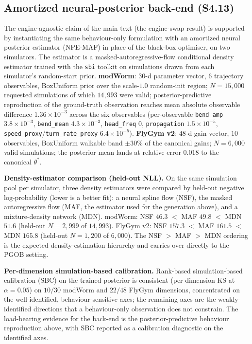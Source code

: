 \documentclass[11pt]{article}
\begin{document}
\subsection{Amortized neural-posterior back-end (S4.13)}
\label{si:sbi}
The engine-agnostic claim of the main text (the engine-swap result) is supported by instantiating the same behaviour-only formulation with an amortized neural posterior estimator (NPE-MAF) in place of the black-box optimiser, on two simulators. The estimator is a masked-autoregressive-flow conditional density estimator trained with the \texttt{sbi} toolkit on simulations drawn from each simulator's random-start prior. \textbf{modWorm}: $30$-d parameter vector, $6$ trajectory observables, BoxUniform prior over the scale-$1.0$ random-init region; $N{=}15{,}000$ requested simulations of which $14{,}993$ were valid; posterior-predictive reproduction of the ground-truth observation reaches mean absolute observable difference $1.36\times10^{-3}$ across the six observables (per-observable \texttt{bend\_amp} $3.8\times10^{-3}$, \texttt{bend\_mean} $4.3\times10^{-3}$, \texttt{head\_freq} $0$, \texttt{propagation} $1.5\times10^{-5}$, \texttt{speed\_proxy}/\texttt{turn\_rate\_proxy} $6.4\times10^{-5}$). \textbf{FlyGym v2}: $48$-d gain vector, $10$ observables, BoxUniform walkable band $\pm30\%$ of the canonical gains; $N{=}6{,}000$ valid simulations; the posterior mean lands at relative error $0.018$ to the canonical $\theta^{*}$.

\textbf{Density-estimator comparison (held-out NLL).} On the same simulation pool per simulator, three density estimators were compared by held-out negative log-probability (lower is a better fit): a neural spline flow (NSF), the masked autoregressive flow (MAF, the estimator used for the generation above), and a mixture-density network (MDN). modWorm: NSF $46.3$ $<$ MAF $49.8$ $<$ MDN $51.6$ (held-out $N{=}2{,}999$ of $14{,}993$). FlyGym v2: NSF $157.3$ $<$ MAF $161.5$ $<$ MDN $165.8$ (held-out $N{=}1{,}200$ of $6{,}000$). The NSF $>$ MAF $>$ MDN ordering is the expected density-estimation hierarchy and carries over directly to the PGOB setting.

\textbf{Per-dimension simulation-based calibration.} Rank-based simulation-based calibration (SBC) on the trained posterior is consistent (per-dimension KS at $\alpha{=}0.05$) on $10/30$ modWorm and $22/48$ FlyGym dimensions, concentrated on the well-identified, behaviour-sensitive axes; the remaining axes are the weakly-identified directions that a behaviour-only observation does not constrain. The load-bearing evidence for the back-end is the posterior-predictive behaviour reproduction above, with SBC reported as a calibration diagnostic on the identified axes.
\end{document}
